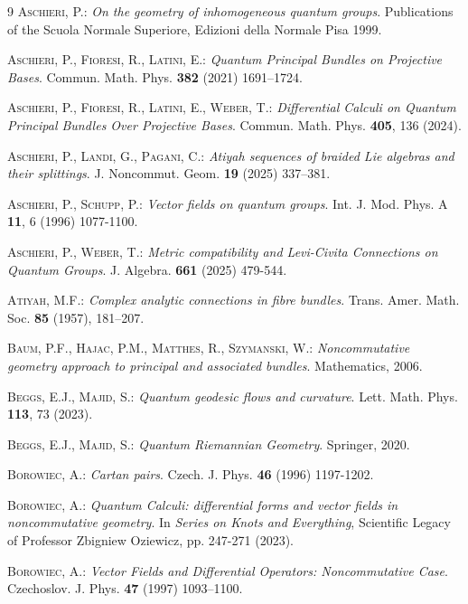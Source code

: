 \documentclass{article}
\theoremstyle{definition}
\begin{document}
{\begin{thebibliography}{9}
	\textsc{Aschieri, P.:}
	\textit{On the geometry of inhomogeneous quantum groups}.
	Publications of the Scuola Normale Superiore, Edizioni della Normale Pisa 1999.
	
	\textsc{Aschieri, P., Fioresi, R., Latini, E.:}
	\textit{Quantum Principal Bundles on Projective Bases}.
	Commun. Math. Phys. \textbf{382} (2021) 1691–1724.
	
	\textsc{Aschieri, P., Fioresi, R., Latini, E., Weber, T.:}
	\textit{Differential Calculi on Quantum Principal Bundles Over Projective Bases}. Commun. Math. Phys. \textbf{405}, 136 (2024).
	
	\textsc{Aschieri, P., Landi, G., Pagani, C.:}
	\textit{Atiyah sequences of braided Lie algebras and their splittings}. J. Noncommut. Geom. \textbf{19} (2025) 337–381.
	
	\textsc{Aschieri, P., Schupp, P.:}
	\textit{Vector fields on quantum groups}.
	Int. J. Mod. Phys. A \textbf{11}, 6 (1996) 1077-1100.
	
	\textsc{Aschieri, P., Weber, T.:} 
	\emph{Metric compatibility and Levi-Civita Connections on Quantum Groups}. J. Algebra. \textbf{661} (2025) 479-544.
	
	\textsc{Atiyah, M.F.:} 
	\textit{Complex analytic connections in fibre bundles}. Trans. Amer. Math. Soc. \textbf{85} (1957), 181–207.
	
	\textsc{Baum, P.F., Hajac, P.M., Matthes, R., Szymanski, W.:} 
	\textit{Noncommutative geometry approach to principal and
		associated bundles}. Mathematics, 2006.
	
	\textsc{Beggs, E.J., Majid, S.:}
	\textit{Quantum geodesic flows and curvature}.
	Lett. Math. Phys. \textbf{113}, 73 (2023).
	
	\textsc{Beggs, E.J., Majid, S.:}
	\textit{Quantum Riemannian Geometry}.
	Springer, 2020.
	
	\textsc{{Borowiec}, A.:} 
	\textit{Cartan pairs}. 
	Czech. J. Phys. \textbf{46} (1996) 1197-1202.
	
	\textsc{{Borowiec}, A.:}
	\textit{Quantum Calculi: differential forms and vector fields in noncommutative geometry}. 
	In \textit{Series on Knots and Everything}, Scientific Legacy of Professor Zbigniew Oziewicz, pp. 247-271 (2023).
	
	\textsc{{Borowiec}, A.:} \textit{Vector Fields and Differential Operators: Noncommutative Case}. Czechoslov. J. Phys. \textbf{47} (1997) 1093–1100.
	

\end{thebibliography}}
\end{document}
